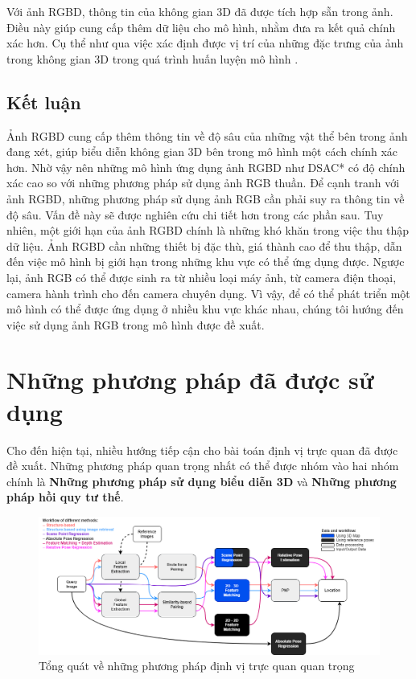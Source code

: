 Với ảnh RGBD, thông tin của không gian 3D đã được tích hợp sẵn trong ảnh. Điều này giúp cung cấp thêm dữ liệu cho mô hình, nhằm đưa ra kết quả chính xác hơn. Cụ thể như qua việc xác định được vị trí của những đặc trưng của ảnh trong không gian 3D trong quá trình huấn luyện mô hình \cite{brachmann2021visual,arnold2022mapfree}.


\subsection{Kết luận}
Ảnh RGBD cung cấp thêm thông tin về độ sâu của những vật thể bên trong ảnh đang xét, giúp biểu diễn không gian 3D bên trong mô hình một cách chính xác hơn. Nhờ vậy nên những mô hình ứng dụng ảnh RGBD như DSAC* \cite{brachmann2021visual} có độ chính xác cao so với những phương pháp sử dụng ảnh RGB thuần. Để cạnh tranh với ảnh RGBD, những phương pháp sử dụng ảnh RGB cần phải suy ra thông tin về độ sâu. Vấn đề này sẽ được nghiên cứu chi tiết hơn trong các phần sau. Tuy nhiên, một giới hạn của ảnh RGBD chính là những khó khăn trong việc thu thập dữ liệu. Ảnh RGBD cần những thiết bị đặc thù, giá thành cao để thu thập, dẫn đến việc mô hình bị giới hạn trong những khu vực có thể ứng dụng được. Ngược lại, ảnh RGB có thể được sinh ra từ nhiều loại máy ảnh, từ camera điện thoại, camera hành trình cho đến camera chuyên dụng. Vì vậy, để có thể phát triển một mô hình có thể được ứng dụng ở nhiều khu vực khác nhau, chúng tôi hướng đến việc sử dụng ảnh RGB trong mô hình được đề xuất.

\section{Những phương pháp đã được sử dụng}

Cho đến hiện tại, nhiều hướng tiếp cận cho bài toán định vị trực quan đã được đề xuất. Những phương pháp quan trọng nhất có thể được nhóm vào hai nhóm chính là \textbf{Những phương pháp sử dụng biểu diễn 3D} và \textbf{Những phương pháp hồi quy tư thế}.

\begin{figure}[H]
    \centering
    \includegraphics[width=\textwidth]{pics/Chapter2/overviewViLoc.png}
    \caption{Tổng quát về những phương pháp định vị trực quan quan trọng \cite{methodsLocal}}
\end{figure}

